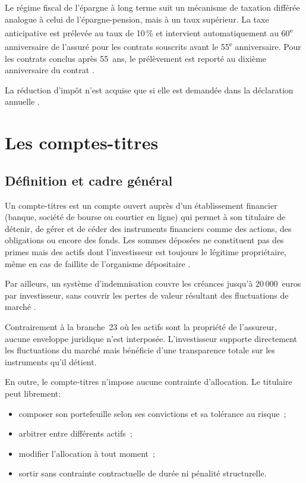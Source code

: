 ﻿\documentclass[12pt, a4paper]{article}
\begin{document}
Le régime fiscal de l'épargne à long terme suit un mécanisme
de taxation différée analogue à celui de l'épargne-pension,
mais à un taux supérieur. La taxe anticipative est prélevée
au taux de 10\,\% et intervient automatiquement au
60\textsuperscript{e} anniversaire de l'assuré pour les
contrats souscrits avant le 55\textsuperscript{e}
anniversaire. Pour les contrats conclus après 55~ans, le
prélèvement est reporté au dixième anniversaire du contrat \cite[art.~184 à 186]{cdtd1927}.

La réduction d'impôt
n'est acquise que si elle est demandée dans la déclaration
annuelle \cite[art.~184]{cdtd1927}.

\newpage
\section{Les comptes-titres}

\subsection{Définition et cadre général}

Un compte-titres est un compte ouvert auprès d'un
établissement financier (banque, société de bourse ou
courtier en ligne) qui permet à son titulaire de détenir,
de gérer et de céder des instruments financiers comme des actions,
des obligations ou encore des fonds. Les sommes déposées ne constituent 
pas des primes mais des actifs dont l'investisseur est toujours le légitime 
propriétaire, même en cas de faillite de l'organisme dépositaire \cite{wikifin_b}.

Par ailleurs, un système d'indemnisation couvre les créances jusqu'à 20\,000~euros par
investisseur, sans couvrir les pertes de valeur résultant
des fluctuations de marché \cite{directive97_9_ce}.

Contrairement à la branche~23 où les actifs sont la
propriété de l'assureur, aucune enveloppe juridique
n'est interposée. L'investisseur supporte directement
les fluctuations du marché mais bénéficie d'une
transparence totale sur les instruments qu'il détient.

En outre, le compte-titres n'impose
aucune contrainte d'allocation. Le titulaire peut
librement:
\begin{itemize}
  \item composer son portefeuille selon ses convictions et sa tolérance au risque~;
  \item arbitrer entre différents actifs~;
  \item modifier l'allocation à tout moment~;
  \item sortir sans contrainte contractuelle de durée ni pénalité structurelle.
\end{itemize}
\end{document}
